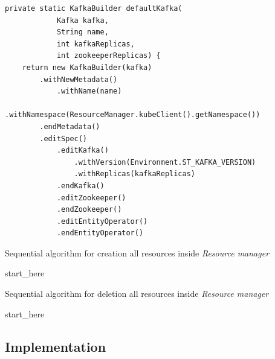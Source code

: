 \begin{verbatim}
private static KafkaBuilder defaultKafka(
            Kafka kafka,
            String name,
            int kafkaReplicas,
            int zookeeperReplicas) {
    return new KafkaBuilder(kafka)
        .withNewMetadata()
            .withName(name)
            .withNamespace(ResourceManager.kubeClient().getNamespace())
        .endMetadata()
        .editSpec()
            .editKafka()
                .withVersion(Environment.ST_KAFKA_VERSION)
                .withReplicas(kafkaReplicas)
            .endKafka()
            .editZookeeper()
            .endZookeeper()
            .editEntityOperator()
            .endEntityOperator()
\end{verbatim}

\begin{algorithm}[H]
    \label{01:alg:dsds}
    \caption{Sequential algorithm for creation all resources inside \emph{Resource manager}}

    \begin{algorithmic}[1]
        \State start\_here
    \end{algorithmic}
\end{algorithm}


\begin{algorithm}[H]
    \label{01:alg:dsdsd+}
    \caption{Sequential algorithm for deletion all resources inside \emph{Resource manager}}

    \begin{algorithmic}[1]
        \State start\_here
    \end{algorithmic}
\end{algorithm}


\subsection*{Implementation}